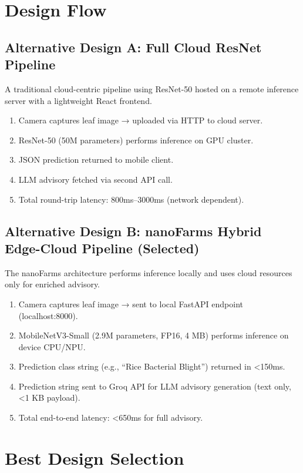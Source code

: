 \documentclass[12pt,oneside]{report}
\begin{document}
\section{Design Flow}

\subsection{Alternative Design A: Full Cloud ResNet Pipeline}
A traditional cloud-centric pipeline using ResNet-50 hosted on a remote inference server with a lightweight React frontend.

\begin{enumerate}
    \item Camera captures leaf image → uploaded via HTTP to cloud server.
    \item ResNet-50 (50M parameters) performs inference on GPU cluster.
    \item JSON prediction returned to mobile client.
    \item LLM advisory fetched via second API call.
    \item Total round-trip latency: 800ms--3000ms (network dependent).
\end{enumerate}

\subsection{Alternative Design B: nanoFarms Hybrid Edge-Cloud Pipeline (Selected)}
The nanoFarms architecture performs inference locally and uses cloud resources only for enriched advisory.

\begin{enumerate}
    \item Camera captures leaf image → sent to local FastAPI endpoint (localhost:8000).
    \item MobileNetV3-Small (2.9M parameters, FP16, 4 MB) performs inference on device CPU/NPU.
    \item Prediction class string (e.g., ``Rice Bacterial Blight'') returned in <150ms.
    \item Prediction string sent to Groq API for LLM advisory generation (text only, <1 KB payload).
    \item Total end-to-end latency: <650ms for full advisory.
\end{enumerate}

\section{Best Design Selection}
\end{document}
